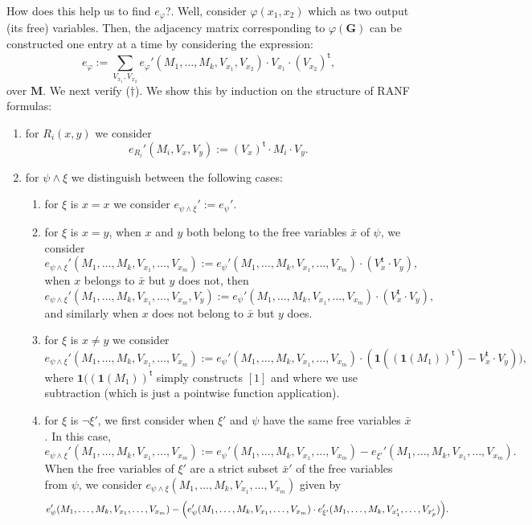 How does this help us to find $e_{\varphi}$?. Well, consider $\varphi(x_1,x_2)$ which as two output (its free) variables. Then, the adjacency matrix corresponding to $\varphi(\mathbf{G})$ can be constructed one entry at a time by considering the expression:
$$
e_{\varphi}:=\sum_{V_{x_1},V_{x_2}} e_\varphi'(M_1,\ldots,M_k,V_{x_1},V_{x_2})\cdot V_{x_1}\cdot (V_{x_2})^{\mathsf{t}},
$$
over $\mathbf{M}$.
We next verify ($\dagger$). We show this by induction on the structure of RANF formulas:
\begin{enumerate}
\item for $R_i(x,y)$ we consider 
\[e_{R_i}'(M_i,V_x,V_y):=(V_{x})^{\mathsf{t}}\cdot M_i\cdot V_y.\]
\item for $\psi \land \xi$ we distinguish between the following cases:
\begin{enumerate}
\item  for $\xi$ is $x=x$ we consider $e_{\psi\land \xi}':=e_{\psi}'$.
\item  for $\xi$ is $x=y$, when $x$ and $y$ both belong to the free variables $\bar x$ of $\psi$, we consider 
\[
e_{\psi\land \xi}'(M_1,\ldots,M_k,V_{x_1},\ldots,V_{x_m}):=e_{\psi}'(M_1,\ldots,M_k,V_{x_1},\ldots,V_{x_m})\cdot (V_{x}^{\mathsf{t}}\cdot V_y),
\]
when $x$ belongs to $\bar x$ but $y$ does not,  then
\[
e_{\psi\land \xi}'(M_1,\ldots,M_k,V_{x_1},\ldots,V_{x_m},V_y):=e_{\psi}'(M_1,\ldots,M_k,V_{x_1},\ldots,V_{x_m})\cdot (V_{x}^{\mathsf{t}}\cdot V_y),
\]
and similarly when $x$ does not belong to $\bar x$ but $y$ does.
\item for $\xi$ is $x\neq y$ we consider 
\[
e_{\psi\land \xi}'(M_1,\ldots,M_k,V_{x_1},\ldots,V_{x_m}):=e_{\psi}'(M_1,\ldots,M_k,V_{x_1},\ldots,V_{x_m})\cdot (\mathbf{1}((\mathbf{1}(M_1))^{\mathsf{t}}) - V_{x}^{\mathsf{t}}\cdot V_y)),
\]
where $\mathbf{1}((\mathbf{1}(M_1))^{\mathsf{t}}$ simply constructs $[1]$ and where we use subtraction (which is just a pointwise function application).
\item for $\xi$ is $\neg \xi'$, we first consider when $\xi'$ and $\psi$ have the same free variables $\bar x$. In this case,
\[
e_{\psi\land \xi}'(M_1,\ldots,M_k,V_{x_1},\ldots,V_{x_m}):=e_{\psi}'(M_1,\ldots,M_k,V_{x_1},\ldots,V_{x_m})-e_{\xi'}'(M_1,\ldots,M_k,V_{x_1},\ldots,V_{x_m}).
\]
 When the free variables of $\xi'$ are a strict subset $\bar x'$ of the free variables from $\psi$, we consider $e_{\psi\land \xi}(M_1,\ldots,M_k,V_{x_1},\ldots,V_{x_m})$ given by
\[
e_{\psi}'(M_1,\ldots,M_k,V_{x_1},\ldots,V_{x_m})-\Bigl(e_{\psi}'(M_1,\ldots,M_k,V_{x_1},\ldots,V_{x_m})\cdot e_{\xi'}'(M_1,\ldots,M_k,V_{x_1'},\ldots,V_{x_p'})\Bigr).
\]
\end{enumerate}
\end{enumerate}

